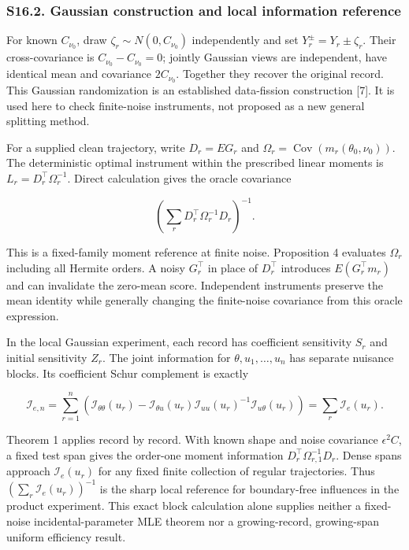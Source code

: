 \documentclass[
  american,
  11pt,
]{article}
\begin{document}
\subsubsection{S16.2. Gaussian construction and local information
reference}\label{s16.2.-gaussian-construction-and-local-information-reference}

For known \(C_{\nu_0}\), draw \(\zeta_r\sim N(0,C_{\nu_0})\)
independently and set \(Y_r^\pm=Y_r\pm\zeta_r\). Their cross-covariance
is \(C_{\nu_0}-C_{\nu_0}=0\); jointly Gaussian views are independent,
have identical mean and covariance \(2C_{\nu_0}\). Together they recover
the original record. This Gaussian randomization is an established
data-fission construction {[}7{]}. It is used here to check finite-noise
instruments, not proposed as a new general splitting method.

For a supplied clean trajectory, write \(D_r=E G_r\) and
\(\Omega_r=\operatorname{Cov}(m_r(\theta_0,\nu_0))\). The deterministic
optimal instrument within the prescribed linear moments is
\(L_r=D_r^\top\Omega_r^{-1}\). Direct calculation gives the oracle
covariance

\[
\left(\sum_r D_r^\top\Omega_r^{-1}D_r\right)^{-1}.
\]

This is a fixed-family moment reference at finite noise. Proposition 4
evaluates \(\Omega_r\) including all Hermite orders. A noisy
\(G_r^\top\) in place of \(D_r^\top\) introduces \(E(G_r^\top m_r)\) and
can invalidate the zero-mean score. Independent instruments preserve the
mean identity while generally changing the finite-noise covariance from
this oracle expression.

In the local Gaussian experiment, each record has coefficient
sensitivity \(S_r\) and initial sensitivity \(Z_r\). The joint
information for \(\theta,u_1,\ldots,u_n\) has separate nuisance blocks.
Its coefficient Schur complement is exactly

\[
\mathcal I_{e,n}=\sum_{r=1}^n
\left(\mathcal I_{\theta\theta}(u_r)-
\mathcal I_{\theta u}(u_r)\mathcal I_{uu}(u_r)^{-1}
\mathcal I_{u\theta}(u_r)\right)
=\sum_r\mathcal I_e(u_r).
\]

Theorem 1 applies record by record. With known shape and noise
covariance \(\epsilon^2 C\), a fixed test span gives the order-one
moment information \(D_r^\top\Omega_{r,1}^{-1}D_r\). Dense spans
approach \(\mathcal I_e(u_r)\) for any fixed finite collection of
regular trajectories. Thus \((\sum_r\mathcal I_e(u_r))^{-1}\) is the
sharp local reference for boundary-free influences in the product
experiment. This exact block calculation alone supplies neither a
fixed-noise incidental-parameter MLE theorem nor a growing-record,
growing-span uniform efficiency result.
\end{document}
